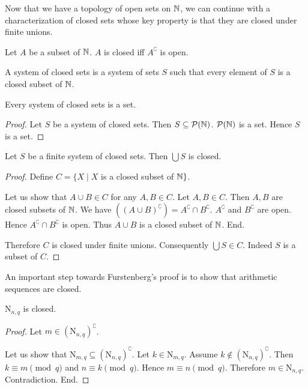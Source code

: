 \documentclass{article}
\newcommand{\N}{\mathrm{N}}
\begin{document}
  Now that we have a topology of open sets on $\mathbb{N}$, we can continue
  with a characterization of closed sets whose key property is that they are
  closed under finite unions.

  \begin{forthel}
    \begin{definition}
      Let $A$ be a subset of $\mathbb{N}$.
      $A$ is closed iff $A^\complement$ is open.
    \end{definition}

    \begin{definition}
      A system of closed sets is a system of sets $S$ such that every element of
      $S$ is a closed subset of $\mathbb{N}$.
    \end{definition}

    \begin{lemma}
      Every system of closed sets is a set.
    \end{lemma}
    \begin{proof}
      Let $S$ be a system of closed sets.
      Then $S \subseteq \mathcal{P}(\mathbb{N})$.
      $\mathcal{P}(\mathbb{N})$ is a set.
      Hence $S$ is a set.
    \end{proof}

    \begin{lemma}
      Let $S$ be a finite system of closed sets.
      Then $\bigcup S$ is closed.
    \end{lemma}
    \begin{proof}
      Define $C = \{ X \mid X$ is a closed subset of $\mathbb{N} \}$.

      Let us show that $A \cup B \in C$ for any $A, B \in C$.
        Let $A, B \in C$.
        Then $A, B$ are closed subsets of $\mathbb{N}$.
        We have $((A \cup B)^\complement) = A^\complement \cap B^\complement$. %
        $A^\complement$ and $B^\complement$ are open.
        Hence $A^\complement \cap B^\complement$ is open.
        Thus $A \cup B$ is a closed subset of $\mathbb{N}$.
      End.

      Therefore $C$ is closed under finite unions.
      Consequently $\bigcup S \in C$.
      Indeed $S$ is a subset of $C$.
    \end{proof}
  \end{forthel}

  An important step towards Furstenberg's proof is to show that arithmetic
  sequences are closed.

  \begin{forthel}
    \begin{lemma}
      $\N_{n, q}$ is closed.
    \end{lemma}
    \begin{proof}
      Let $m \in (\N_{n, q})^\complement$.

      Let us show that $\N_{m, q} \subseteq (\N_{n, q})^\complement$.
        Let $k \in \N_{m, q}$.
        Assume $k \notin (\N_{n, q})^\complement$.
        Then $k \equiv m \pmod{q}$ and $n \equiv k \pmod{q}$.
        Hence $m \equiv n \pmod{q}$.
        Therefore $m \in \N_{n, q}$.
        Contradiction.
      End.
    \end{proof}
  \end{forthel}
\end{document}

